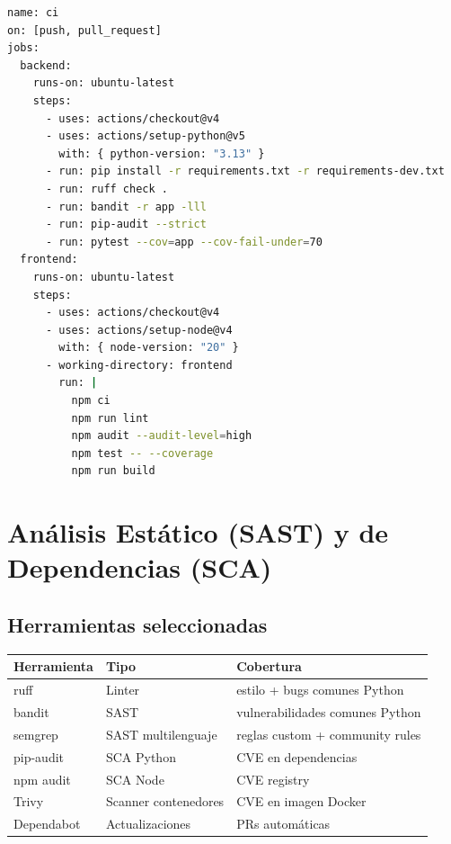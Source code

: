 \documentclass[12pt,a4paper,oneside]{article}
\begin{document}
\begin{lstlisting}[language=bash,morekeywords={name,on,jobs,runs,uses,steps,with}]
name: ci
on: [push, pull_request]
jobs:
  backend:
    runs-on: ubuntu-latest
    steps:
      - uses: actions/checkout@v4
      - uses: actions/setup-python@v5
        with: { python-version: "3.13" }
      - run: pip install -r requirements.txt -r requirements-dev.txt
      - run: ruff check .
      - run: bandit -r app -lll
      - run: pip-audit --strict
      - run: pytest --cov=app --cov-fail-under=70
  frontend:
    runs-on: ubuntu-latest
    steps:
      - uses: actions/checkout@v4
      - uses: actions/setup-node@v4
        with: { node-version: "20" }
      - working-directory: frontend
        run: |
          npm ci
          npm run lint
          npm audit --audit-level=high
          npm test -- --coverage
          npm run build
\end{lstlisting}

\section{Análisis Estático (SAST) y de Dependencias (SCA)}

\subsection{Herramientas seleccionadas}

\begin{table}[h]
\centering
\small
\begin{tabularx}{\textwidth}{lll}
\toprule
\textbf{Herramienta} & \textbf{Tipo} & \textbf{Cobertura} \\
\midrule
ruff & Linter & estilo + bugs comunes Python \\
bandit & SAST & vulnerabilidades comunes Python \\
semgrep & SAST multilenguaje & reglas custom + community rules \\
pip-audit & SCA Python & CVE en dependencias \\
npm audit & SCA Node & CVE registry \\
Trivy & Scanner contenedores & CVE en imagen Docker \\
Dependabot & Actualizaciones & PRs automáticas \\
\bottomrule
\end{tabularx}
\end{table}
\end{document}
